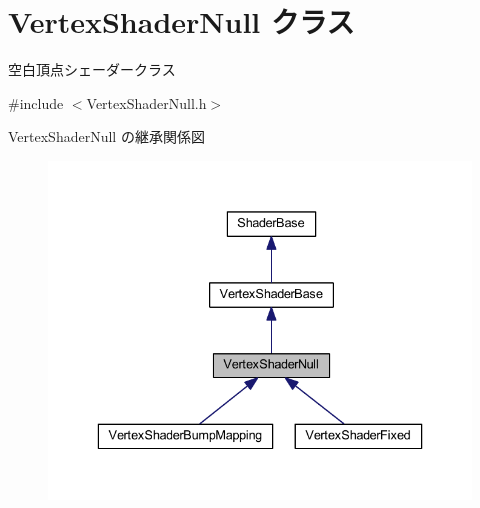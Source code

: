 \hypertarget{class_vertex_shader_null}{}\section{Vertex\+Shader\+Null クラス}
\label{class_vertex_shader_null}


空白頂点シェーダークラス  




{\ttfamily \#include $<$Vertex\+Shader\+Null.\+h$>$}



Vertex\+Shader\+Null の継承関係図\nopagebreak
\begin{figure}[H]
\begin{center}
\leavevmode
\includegraphics[width=336pt]{class_vertex_shader_null__inherit__graph}
\end{center}
\end{figure}
